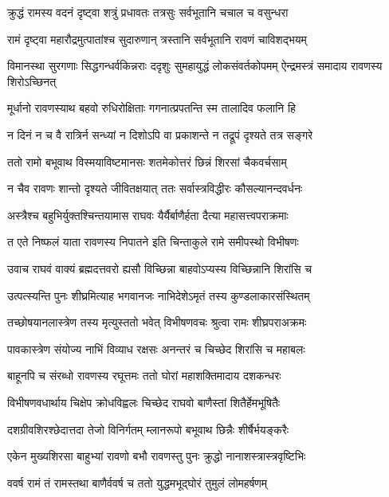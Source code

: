 \twolineshloka
{क्रुद्धं रामस्य वदनं दृष्ट्वा शत्रुं प्रधावतः}
{तत्रसुः सर्वभूतानि चचाल च वसुन्धरा} %

\twolineshloka
{रामं दृष्ट्वा महारौद्रमुत्पातांश्च सुदारुणान्}
{त्रस्तानि सर्वभूतानि रावणं चाविशद्भयम्} %

\threelineshloka
{विमानस्था सुरगणाः सिद्धगन्धर्वकिन्नराः}
{ददृशुः सुमहायुद्धं लोकसंवर्तकोपमम्}
{ऐन्द्रमस्त्रं समादाय रावणस्य शिरोऽच्छिनत्} %

\twolineshloka
{मूर्धानो रावणस्याथ बहवो रुधिरोक्षिताः}
{गगनात्प्रपतन्ति स्म तालादिव फलानि हि} %

\twolineshloka
{न दिनं न च वै रात्रिर्न सन्ध्यां न दिशोऽपि वा}
{प्रकाशन्ते न तद्रूपं दृश्यते तत्र सङ्गरे} %

\twolineshloka
{ततो रामो बभूवाथ विस्मयाविष्टमानसः}
{शतमेकोत्तरं छिन्नं शिरसां चैकवर्चसाम्} %

\twolineshloka
{न चैव रावणः शान्तो दृश्यते जीवितक्षयात्}
{ततः सर्वास्त्रविद्धीरः कौसल्यानन्दवर्धनः} %

\twolineshloka
{अस्त्रैश्च बहुभिर्युक्तश्चिन्तयामास राघवः}
{यैर्यैर्बाणैर्हता दैत्या महासत्त्वपराक्रमाः} %

\twolineshloka
{त एते निष्फलं याता रावणस्य निपातने}
{इति चिन्ताकुले रामे समीपस्थो विभीषणः} %

\twolineshloka
{उवाच राघवं वाक्यं ब्रह्मदत्तवरो ह्यसौ}
{विच्छिन्ना बाहवोऽप्यस्य विच्छिन्नानि शिरांसि च} %

\twolineshloka
{उत्पत्स्यन्ति पुनः शीघ्रमित्याह भगवानजः}
{नाभिदेशेऽमृतं तस्य कुण्डलाकारसंस्थितम्} %

\twolineshloka
{तच्छोषयानलास्त्रेण तस्य मृत्युस्ततो भवेत्}
{विभीषणवचः श्रुत्वा रामः शीघ्रपराअक्रमः} %

\twolineshloka
{पावकास्त्रेण संयोज्य नाभिं विव्याध रक्षसः}
{अनन्तरं च चिच्छेद शिरांसि च महाबलः} %

\twolineshloka
{बाहूनपि च संरब्धो रावणस्य रघूत्तमः}
{ततो घोरां महाशक्तिमादाय दशकन्धरः} %

\twolineshloka
{विभीषणवधार्थाय चिक्षेप क्रोधविह्वलः}
{चिच्छेद राघवो बाणैस्तां शितैर्हेमभूषितैः} %

\twolineshloka
{दशग्रीवशिरश्छेदात्तदा तेजो विनिर्गतम्}
{म्लानरूपो बभूवाथ छिन्नैः शीर्षैर्भयङ्करैः} %

\twolineshloka
{एकेन मुख्यशिरसा बाहुभ्यां रावणो बभौ}
{रावणस्तु पुनः क्रुद्धो नानाशस्त्रास्त्रवृष्टिभिः} %

\twolineshloka
{ववर्ष रामं तं रामस्तथा बाणैर्ववर्ष च}
{ततो युद्धमभूद्घोरं तुमुलं लोमहर्षणम्} %

